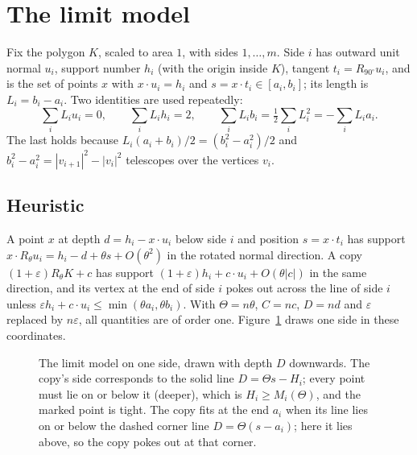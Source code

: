\documentclass[11pt]{amsart}
\theoremstyle{remark}\newtheorem{remark}[theorem]{Remark}
\begin{document}
\section{The limit model}\label{sec:model}

Fix the polygon $K$, scaled to area $1$, with sides $1,\dots,m$. Side $i$ has outward unit normal $u_i$, support
number $h_i$ (with the origin inside $K$), tangent $t_i=R_{90^\circ}u_i$, and is the set of points $x$ with
$x\cdot u_i=h_i$ and $s=x\cdot t_i\in[a_i,b_i]$; its length is $L_i=b_i-a_i$. Two identities are used repeatedly:
\begin{equation}\label{eq:ids}
\sum_i L_iu_i=0,\qquad \sum_i L_ih_i=2,\qquad \sum_i L_ib_i=\tfrac12\sum_iL_i^2=-\sum_iL_ia_i .
\end{equation}
The last holds because $L_i(a_i+b_i)/2=(b_i^2-a_i^2)/2$ and $b_i^2-a_i^2=|v_{i+1}|^2-|v_i|^2$ telescopes over the
vertices $v_i$.

\subsection*{Heuristic} A point $x$ at depth $d=h_i-x\cdot u_i$ below side $i$ and position $s=x\cdot t_i$ has
support $x\cdot R_\theta u_i=h_i-d+\theta s+O(\theta^2)$ in the rotated normal direction. A copy $(1+\varepsilon)R_\theta
K+c$ has support $(1+\varepsilon)h_i+c\cdot u_i+O(\theta|c|)$ in the same direction, and its vertex at the end of side
$i$ pokes out across the line of side $i$ unless $\varepsilon h_i+c\cdot u_i\le\min(\theta a_i,\theta b_i)$. With
$\Theta=n\theta$, $C=nc$, $D=nd$ and $\varepsilon$ replaced by $n\varepsilon$, all quantities are of order one. Figure~\ref{fig:model} draws one side in these coordinates.

\begin{figure}[ht]
\centering
{}
\caption{The limit model on one side, drawn with depth $D$ downwards. The copy's side corresponds to the solid line
$D=\Theta s-H_i$; every point must lie on or below it (deeper), which is $H_i\ge M_i(\Theta)$, and the marked point is
tight. The copy fits at the end $a_i$ when its line lies on or below the dashed corner line $D=\Theta(s-a_i)$; here it
lies above, so the copy pokes out at that corner.}
\label{fig:model}
\end{figure}
\end{document}
